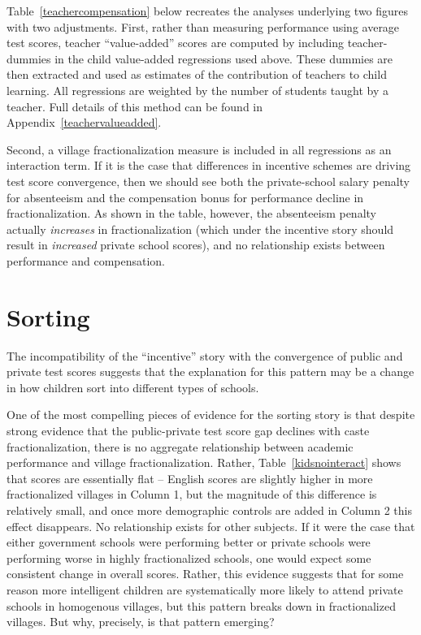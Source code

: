 \documentclass[12pt]{article}
\begin{document}
\begin{figure}[htb]
\begin{center}
	\end{center}
\end{figure}

Table~\ref{teachercompensation} below recreates the analyses underlying two figures with two adjustments. First, rather than measuring performance using average test scores, teacher ``value-added'' scores are computed by including teacher-dummies in the child value-added regressions used above. These dummies are then extracted and used as estimates of the contribution of teachers to child learning. All regressions are weighted by the number of students taught by a teacher. Full details of this method can be found in Appendix~\ref{teachervalueadded}. 

Second, a village fractionalization measure is included in all regressions as an interaction term. If it is the case that differences in incentive schemes are driving test score convergence, then we should see both the private-school salary penalty for absenteeism and the compensation bonus for performance decline in fractionalization. As shown in the table, however, the absenteeism penalty actually \emph{increases} in fractionalization (which under the incentive story should result in \emph{increased} private school scores), and no relationship exists between performance and compensation. 





\section{Sorting}\label{results} %

The incompatibility of the ``incentive'' story with the convergence of public and private test scores suggests that the explanation for this pattern may be a change in how children sort into different types of schools. 

One of the most compelling pieces of evidence for the sorting story is that despite strong evidence that the public-private test score gap declines with caste fractionalization, there is no aggregate relationship between academic performance and village fractionalization. Rather, Table~\ref{kidsnointeract} shows that scores are essentially flat -- English scores are slightly higher in more fractionalized villages in Column 1, but the magnitude of this difference is relatively small, and once more demographic controls are added in Column 2 this effect disappears. No relationship exists for other subjects. If it were the case that either government schools were performing better or private schools were performing worse in highly fractionalized schools, one would expect some consistent change in overall scores. Rather, this evidence suggests that for some reason more intelligent children are systematically more likely to attend private schools in homogenous villages, but this pattern breaks down in fractionalized villages. But why, precisely, is that pattern emerging? 
\end{document}
